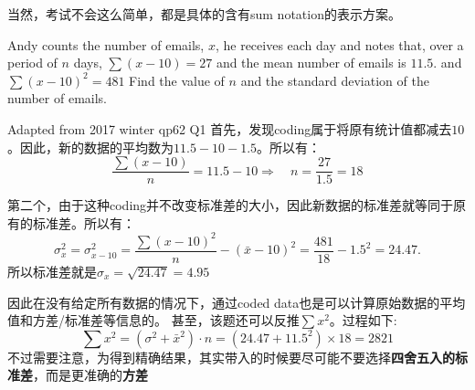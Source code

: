 当然，考试不会这么简单，都是具体的含有sum notation的表示方案。

\begin{ExampleBox}
Andy counts the number of emails, $x$, he receives each day and notes that, over a period of $n$ days, $\sum (x − 10) = 27$ and the mean number of emails is $11.5$. and $\sum (x-10)^2 =481$ Find the value of $n$ and the standard deviation of the number of emails.

\makebox{}\hfill Adapted from 2017 winter qp62 Q1
\tcblower
首先，发现coding属于将原有统计值都减去$10$。因此，新的数据的平均数为$11.5-10-1.5$。所以有：
\[
    \frac{\sum (x-10)}{n} =11.5-10 \Longrightarrow \quad n=\frac{27}{1.5}=18
\]

第二个，由于这种coding并不改变标准差的大小，因此新数据的标准差就等同于原有的标准差。所以有：
\[
    \sigma^2 _{x}=\sigma^2 _{x-10} = \frac{\sum{(x-10)^2}}{n}-(\bar{x}-10)^2 = \frac{481}{18}-1.5^2=24.47.
\]
所以标准差就是$\sigma_x=\sqrt{24.47}= 4.95$

因此在没有给定所有数据的情况下，通过coded data也是可以计算原始数据的平均值和方差/标准差等信息的。
甚至，该题还可以反推$\sum x^2$。过程如下:
\[\sum x^2 = (\sigma^2 + \bar{x}^2)\cdot n = (24.47+11.5^2)\times 18 =2821\]
不过需要注意，为得到精确结果，其实带入的时候要尽可能不要选择\textbf{四舍五入的标准差}，而是更准确的\textbf{方差}
\end{ExampleBox}
